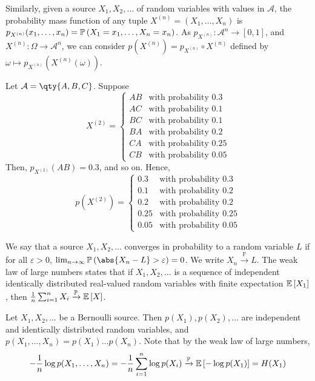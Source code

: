 Similarly, given a source $X_1, X_2, \dots$ of random variables with values in $\mathcal A$, the probability mass function of any tuple $X^{(n)} = (X_1, \dots, X_n)$ is $p_{X^{(n)}}(x_1, \dots, x_n) = \mathbb{P}\left({X_1 = x_1, \dots, X_n = x_n}\right)$.
As $p_{X^{(n)}} \colon \mathcal A^n \to [0,1]$, and $X^{(n)} \colon \Omega \to \mathcal A^n$, we can consider $p(X^{(n)}) = p_{X^{(n)}} \circ X^{(n)}$ defined by $\omega \mapsto p_{X^{(n)}}(X^{(n)}(\omega))$.
\begin{example}
    Let $\mathcal A = \qty{A, B, C}$.
    Suppose
    \[ X^{(2)} = \begin{cases}
        AB & \text{with probability } 0.3 \\
        AC & \text{with probability } 0.1 \\
        BC & \text{with probability } 0.1 \\
        BA & \text{with probability } 0.2 \\
        CA & \text{with probability } 0.25 \\
        CB & \text{with probability } 0.05
    \end{cases} \]
    Then, $p_{X^{(2)}}(AB) = 0.3$, and so on.
    Hence,
    \[ p(X^{(2)}) = \begin{cases}
        0.3 & \text{with probability } 0.3 \\
        0.1 & \text{with probability } 0.2 \\
        0.2 & \text{with probability } 0.2 \\
        0.25 & \text{with probability } 0.25 \\
        0.05 & \text{with probability } 0.05
    \end{cases} \]
\end{example}
We say that a source $X_1,X_2, \dots$ converges in probability to a random variable $L$ if for all $\varepsilon > 0$, $\lim_{n \to \infty} \prob{\abs{X_n - L} > \varepsilon} = 0$.
We write $X_n \xrightarrow{\mathbb P} L$.
The weak law of large numbers states that if $X_1, X_2, \dots$ is a sequence of independent identically distributed real-valued random variables with finite expectation $\mathbb{E}\left[{X_1}\right]$, then $\frac{1}{n} \sum_{i=1}^n X_i \xrightarrow{\mathbb P} \mathbb{E}\left[{X}\right]$.
\begin{example}
    Let $X_1, X_2, \dots$ be a Bernoulli source.
    Then $p(X_1), p(X_2), \dots$ are independent and identically distributed random variables, and $p(X_1, \dots, X_n) = p(X_1) \dots p(X_n)$.
    Note that by the weak law of large numbers,
    \[ -\frac{1}{n} \log p(X_1, \dots, X_n) = -\frac{1}{n} \sum_{i=1}^n \log p(X_i) \xrightarrow{\mathbb P} \mathbb{E}\left[{-\log p(X_1)}\right] = H(X_1) \]
\end{example}
